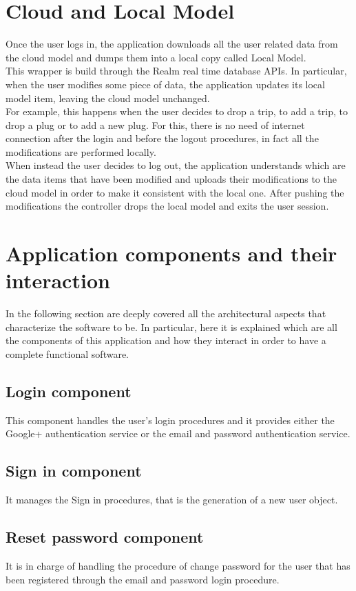 \section{Cloud and Local Model}
Once the user logs in, the application downloads all the user related data from the cloud model and dumps them into a local copy called Local Model. \\
This wrapper is build through the Realm real time database APIs. In particular, when the user modifies some piece of data, the application updates its local model item, leaving the cloud model unchanged.\\
For example, this happens when the user decides to drop a trip, to add a trip, to drop a plug or to add a new plug. 
For this, there is no need of internet connection after the login and before the logout procedures, in fact all the modifications are performed locally.\\
When instead the user decides to log out, the application understands which are the data items that have been modified and uploads their modifications to the cloud model in order to make it consistent with the local one. 
After pushing the modifications the controller drops the local model and exits the user session.

\section{Application components and their interaction}
In the following section are deeply covered all the architectural aspects that characterize the software to be. In particular, here it is explained which are all the components of this application and how they interact in order to have a complete functional software.

\subsection{Login component}
This component handles the user's login procedures and it provides either the Google+ authentication service or the email and password authentication service.

\subsection{Sign in component}
It manages the Sign in procedures, that is the generation of a new user object.

\subsection{Reset password component}
It is in charge of handling the procedure of change password for the user that has been registered through the email and password login procedure.

